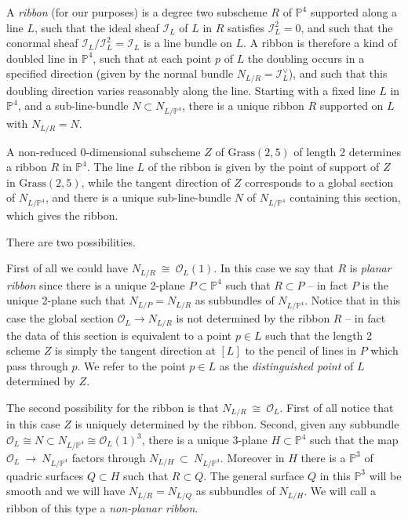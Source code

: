 \documentclass[twoside,12pt,reqno]{amsart}
\theoremstyle{plain}
\theoremstyle{definition}
\newcommand{\PP}{\mathbb{P}}
\def\ps{\vspace{4pt}}
\newcommand{\OO}{\mathcal O}
\begin{document}
\ps

A {\em ribbon} (for our purposes) is a degree two subscheme $R$ of $\PP^4$
supported along a line $L$, such that the ideal sheaf $\mathcal{I}_L$ of 
$L$ in $R$ satisfies $\mathcal{I}_L^2=0$, and such that the conormal sheaf
$\mathcal{I}_L/\mathcal{I}_L^2 = \mathcal{I}_L$ is a line bundle
on $L$.  A ribbon is therefore a kind of doubled line in $\PP^4$, such that
at each point $p$ of $L$ the doubling occurs in a specified direction (given
by the normal bundle $N_{L/R}=\mathcal{I}_L^{\vee}$), and such that this 
doubling direction varies reasonably along the line.
Starting with a fixed line $L$ in $\PP^4$, and a sub-line-bundle
$N\subset N_{L/\PP^4}$, there is a unique ribbon $R$ supported on $L$ with
$N_{L/R}=N$.

\ps

A non-reduced
0-dimensional subscheme $Z$ of $\text{Grass}(2,5)$ of length 2 
determines a ribbon $R$ in $\PP^4$.  The line $L$ of the ribbon is given by 
the point of support of $Z$ in $\text{Grass}(2,5)$, while the tangent 
direction of $Z$ corresponds to a global section of 
$N_{L/\PP^4}$, and there is a unique sub-line-bundle 
$N$ of $N_{L/\PP^4}$ containing this section, which gives the ribbon.


\ps
There are two possibilities.  

\ps

First of all we could have
$N_{L/R}~\cong~\OO_L(1)$.  In this case we say that $R$ is
\emph{planar ribbon} since there is a unique 2-plane $P\subset \PP^4$
such that $R\subset P$ -- in fact $P$ is the unique 2-plane such that
$N_{L/P} = N_{L/R}$ as subbundles of $N_{L/\PP^4}$.  Notice that in
this case the global section $\OO_L\rightarrow N_{L/R}$ is not
determined by the ribbon $R$ -- in fact the data of this section is
equivalent to a point $p\in L$ such that the length 2 scheme $Z$ is simply 
the tangent direction at $[L]$ to the pencil of lines in $P$ which
pass through $p$.  We refer to the point $p\in L$ as the
\emph{distinguished point} of $L$ determined by $Z$.

\ps

The second possibility for the ribbon is that $N_{L/R}~\cong~\OO_L$.
First of all notice that in this case $Z$ is uniquely determined by the ribbon. 
Second, given any subbundle $\OO_L \cong N \subset N_{L/\PP^4} \cong\OO_L(1)^3$,
there is a unique 
3-plane $H\subset \PP^4$ such that the map $\OO_L~\rightarrow~
N_{L/\PP^4}$ factors through $N_{L/H}~\subset~N_{L/\PP^4}$.  Moreover
in $H$ there is a $\PP^3$ of quadric surfaces $Q\subset H$ such that
$R\subset Q$.  The general surface $Q$ in this $\PP^3$  will be smooth 
and we will have $N_{L/R}=N_{L/Q}$ as subbundles of $N_{L/H}$.  We
will call a ribbon of this type a \emph{non-planar ribbon}.
\end{document}
